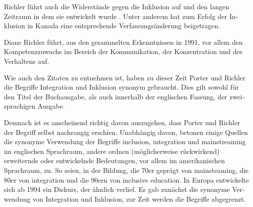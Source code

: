 Richler führt auch die Widerstände gegen die Inklusion auf und den langen Zeitraum in dem sie entwickelt wurde
.
Unter anderem hat zum Erfolg der In­klusion in Kanada eine entsprechende Verfassungsänderung beigetragen.  

Diane Richler führt, aus den gesammelten Erkenntnissen in 1991, vor allem den Kom­pe­tenz­zuwachs im Bereich der Kommunikation, der Konzentration und des Verhaltens auf.

Wie auch den Zitaten zu entnehmen ist, haben zu dieser Zeit Porter und Richler die Begriffe In­te­gration und Inklusion synonym gebraucht. Dies gilt sowohl für den Titel der Buchausgabe, als auch innerhalb der englischen Fassung, der zwei­spra­ch­igen Ausgabe.

Demnach ist es anscheinend richtig davon auszugehen, dass Porter und Richler der Begriff selbst nachrangig erschien. Unabhängig davon, betonen einige Quellen die synonyme Verwendung der Begriffe inclusion, integration und mainstreaming im englischen Sprachraum, andere ordnen (möglicherweise rückwirkend) erweiternde oder entwickelnde Bedeutungen, vor allem im amerikanischen Sprachraum, zu. So seien, in der Bildung, die 70er geprägt von mainsteaming, die 80er von integration und die 90ern von inclusive education. In Europa ent­wickelte sich ab 1994 ein Diskurs, der ähnlich verlief. Es gab zunächst die synonyme Ver­wen­dung von Integration und Inklusion, zur Zeit werden die Begriffe abgegrenzt.  
